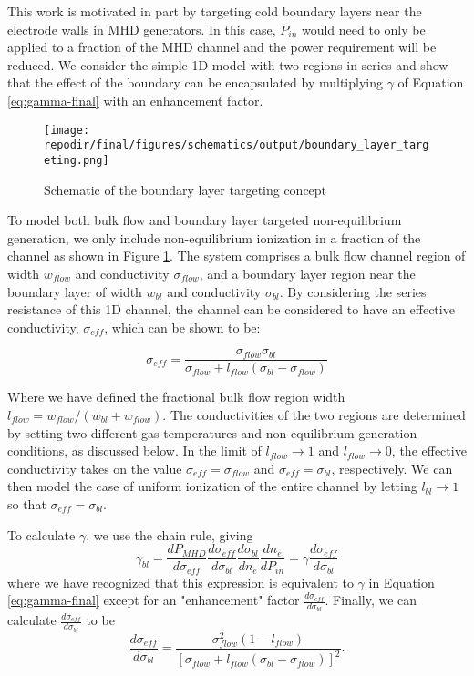 This work is motivated in part by targeting cold boundary layers near the electrode walls in MHD generators. In this case, $P_{in}$ would need to only be applied to a fraction of the MHD channel and the power requirement will be reduced. We consider the simple 1D model with two regions in series and show that the effect of the boundary can be encapsulated by multiplying $\gamma$ of Equation \ref{eq:gamma-final} with an enhancement factor.

\begin{figure}[h]
    \centering
    \texttt{[image: \\repodir/final/figures/schematics/output/boundary\_layer\_targeting.png]} 
    \caption{Schematic of the boundary layer targeting concept}
    \label{fig:SI_boundary_layer_targeting_schematic}
\end{figure}


To model both bulk flow and boundary layer targeted non-equilibrium generation, we only include non-equilibrium ionization in a fraction of the channel as shown in Figure \ref{fig:SI_boundary_layer_targeting_schematic}. The system comprises a bulk flow channel region of width $w_{flow}$ and conductivity $\sigma_{flow}$, and a boundary layer region near the boundary layer of width $w_{bl}$ and conductivity $\sigma_{bl}$. By considering the series resistance of this 1D channel, the channel can be considered to have an effective conductivity, $\sigma_{eff}$, which can be shown to be:  

\begin{equation}
\sigma_{eff}=\frac{\sigma_{flow} \sigma_{bl}}{\sigma_{flow}+l_{flow}  (\sigma_{bl}  -\sigma_{flow})}
\end{equation}

Where we have defined the fractional bulk flow region width $l_{flow}=w_{flow}/(w_{bl}+w_{flow})$. The conductivities of the two regions are determined by setting two different gas temperatures and non-equilibrium generation conditions, as discussed below. In the limit of $l_{flow}\rightarrow1$ and $l_{flow}\rightarrow0$, the effective conductivity takes on the value $\sigma_{eff}= \sigma_{flow}$ and $\sigma_{eff}= \sigma_{bl}$, respectively. We can then model the case of uniform ionization of the entire channel by letting $l_{bl}\rightarrow1$ so that $\sigma_{eff}= \sigma_{bl}$.

To calculate $\gamma$, we use the chain rule, giving
\begin{equation}
\gamma_{bl}=\frac{dP_{MHD}}{d\sigma_{eff}} \frac{d\sigma_{eff}}{d\sigma_{bl}} \frac{d\sigma_{bl}}{dn_e} \frac{dn_e}{dP_{in}}=\gamma \frac{d\sigma_{eff}}{d\sigma_{bl}} 
\end{equation}
where we have recognized that this expression is equivalent to $\gamma$ in Equation \ref{eq:gamma-final} except for an "enhancement" factor $\frac{d\sigma_{eff}}{d\sigma_{bl}}$. Finally, we can calculate $\frac{d\sigma_{eff}}{d\sigma_{bl}}$ to be
\begin{equation}
\frac{d\sigma_{eff}}{d\sigma_{bl}}=\frac{\sigma_{flow}^2 (1-l_{flow})}{[\sigma_{flow}+l_{flow} (\sigma_{bl}-\sigma_{flow})]^2} .
\end{equation}

